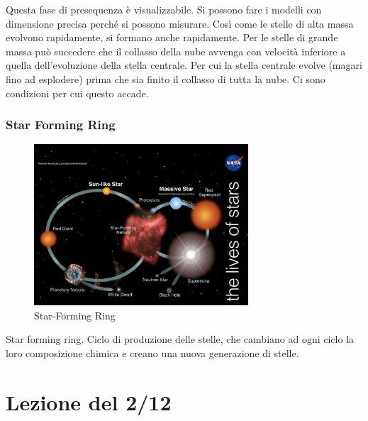 \documentclass[a4paper,11pt]{article}
\begin{document}
Questa fase di presequenza è visualizzabile. Si possono fare i modelli con dimensione precisa perché si possono misurare. Così come le stelle di alta massa evolvono rapidamente, si formano anche rapidamente. Per le stelle di grande massa può succedere che il collasso della nube avvenga con velocità inferiore a quella dell'evoluzione della stella centrale. Per cui la stella centrale evolve (magari fino ad esplodere) prima che sia finito il collasso di tutta la nube. Ci sono condizioni per cui questo accade.
\subsubsection{Star Forming Ring}
\begin{figure}[h!!]
        \centering
        \includegraphics[width=8cm]{lezione 28 novembre/immaginanasa.png}
        \caption{Star-Forming Ring}
        \label{lezione 28 novembre/immaginanasa.png}
    \end{figure}
Star forming ring. Ciclo di produzione delle stelle, che cambiano ad ogni ciclo la loro composizione chimica e creano una nuova generazione di stelle. 



\newpage
\section{Lezione del 2/12}
\subsection{}
\end{document}

